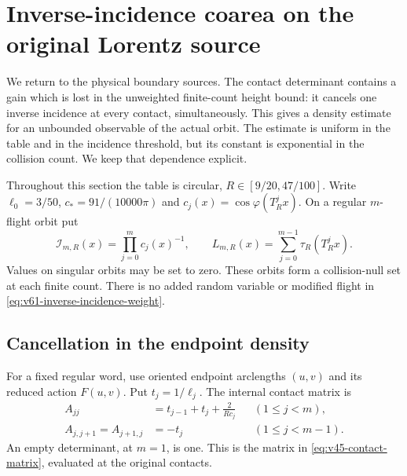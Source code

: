 \section{Inverse-incidence coarea on the original Lorentz source}
\label{sec:v61-inverse-incidence}
We return to the physical boundary sources. The contact determinant
contains a gain which is lost in the unweighted finite-count height
bound: it cancels one inverse incidence at every contact, simultaneously.
This gives a density estimate for an unbounded observable of the actual
orbit. The estimate is uniform in the table and in the incidence
threshold, but its constant is exponential in the collision count.
We keep that dependence explicit.

Throughout this section the table is circular, $R\in[9/20,47/100]$.
Write $\ell_0=3/50$, $c_*=91/(10000\pi)$ and
$c_j(x)=\cos\varphi(T_R^jx)$. On a regular $m$-flight orbit put
\begin{equation}\label{eq:v61-inverse-incidence-weight}
 \mathcal I_{m,R}(x)=\prod_{j=0}^{m}c_j(x)^{-1},\qquad
 L_{m,R}(x)=\sum_{j=0}^{m-1}\tau_R(T_R^jx).
\end{equation}
Values on singular orbits may be set to zero. These orbits form a
collision-null set at each finite count. There is no added random
variable or modified flight in \eqref{eq:v61-inverse-incidence-weight}.

\subsection{Cancellation in the endpoint density}
For a fixed regular word, use oriented endpoint arclengths $(u,v)$
and its reduced action $F(u,v)$. Put $t_j=1/\ell_j$. The internal
contact matrix is
\[
 \begin{aligned}
 A_{jj}&=t_{j-1}+t_j+\frac{2}{Rc_j} &&(1\le j<m),\\
 A_{j,j+1}=A_{j+1,j}&=-t_j &&(1\le j<m-1).
 \end{aligned}
\]
An empty determinant, at $m=1$, is one. This is the matrix in
\eqref{eq:v45-contact-matrix}, evaluated at the original contacts.

